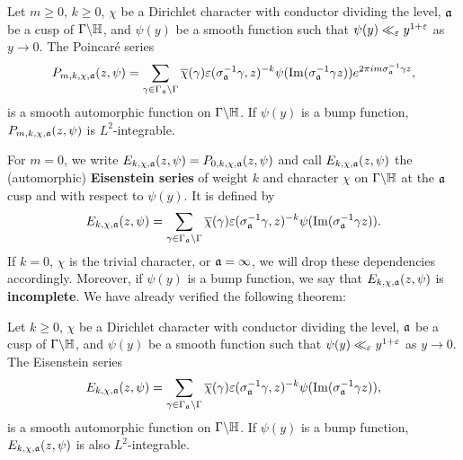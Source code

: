     \begin{theorem}
      Let $m \ge 0$, $k \ge 0$, $\chi$ be a Dirichlet character with conductor dividing the level, $\mathfrak{a}$ be a cusp of $\Gamma\backslash\mathbb{H}$, and $\psi(y)$ be a smooth function such that $\psi(y) \ll_{\varepsilon} y^{1+\varepsilon}$ as $y \to 0$. The Poincar\'e series
      \[
        P_{m,k,\chi,\mathfrak{a}}(z,\psi) = \sum_{\gamma \in \Gamma_{\mathfrak{a}}\backslash\Gamma}\overline{\chi}(\gamma)\varepsilon(\sigma_{\mathfrak{a}}^{-1}\gamma,z)^{-k}\psi(\mathrm{Im}(\sigma_{\mathfrak{a}}^{-1}\gamma z))e^{2\pi im\sigma_{\mathfrak{a}}^{-1}\gamma z},
      \]
      is a smooth automorphic function on $\Gamma\backslash\mathbb{H}$. If $\psi(y)$ is a bump function, $P_{m,k,\chi,\mathfrak{a}}(z,\psi)$ is $L^{2}$-integrable.
    \end{theorem}
    
    For $m = 0$, we write $E_{k,\chi,\mathfrak{a}}(z,\psi) = P_{0,k,\chi,\mathfrak{a}}(z,\psi)$ and call $E_{k,\chi,\mathfrak{a}}(z,\psi)$ the (automorphic) \textbf{Eisenstein series} of weight $k$ and character $\chi$ on $\Gamma\backslash\mathbb{H}$ at the $\mathfrak{a}$ cusp and with respect to $\psi(y)$. It is defined by
    \[
      E_{k,\chi,\mathfrak{a}}(z,\psi) = \sum_{\gamma \in \Gamma_{\mathfrak{a}}\backslash\Gamma}\overline{\chi}(\gamma)\varepsilon(\sigma_{\mathfrak{a}}^{-1}\gamma,z)^{-k}\psi(\mathrm{Im}(\sigma_{\mathfrak{a}}^{-1}\gamma z)).
    \]
    If $k = 0$, $\chi$ is the trivial character, or $\mathfrak{a} = \infty$, we will drop these dependencies accordingly. Moreover, if $\psi(y)$ is a bump function, we say that $E_{k,\chi,\mathfrak{a}}(z,\psi)$ is \textbf{incomplete}. We have already verified the following theorem:
  
    \begin{theorem}
      Let $k \ge 0$, $\chi$ be a Dirichlet character with conductor dividing the level, $\mathfrak{a}$ be a cusp of $\Gamma\backslash\mathbb{H}$, and $\psi(y)$ be a smooth function such that $\psi(y) \ll_{\varepsilon} y^{1+\varepsilon}$ as $y \to 0$. The Eisenstein series
      \[
        E_{k,\chi,\mathfrak{a}}(z,\psi) = \sum_{\gamma \in \Gamma_{\mathfrak{a}}\backslash\Gamma}\overline{\chi}(\gamma)\varepsilon(\sigma_{\mathfrak{a}}^{-1}\gamma,z)^{-k}\psi(\mathrm{Im}(\sigma_{\mathfrak{a}}^{-1}\gamma z)),
      \]
      is a smooth automorphic function on $\Gamma\backslash\mathbb{H}$. If $\psi(y)$ is a bump function, $E_{k,\chi,\mathfrak{a}}(z,\psi)$ is also $L^{2}$-integrable.
    \end{theorem}
    
